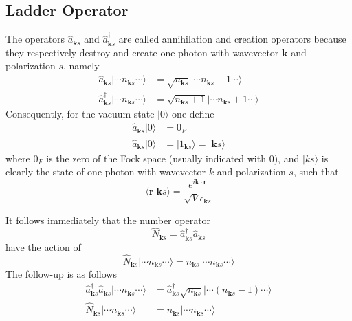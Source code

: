 \documentclass[../../../main.tex]{subfiles}
\begin{document}
\subsection{Ladder Operator}
The operators $\hat{a}_{\mathbf{k }s}$ and $\hat{a}^\dagger_{\mathbf{k }s}$ are called annihilation and creation operators because they respectively destroy and create one photon with wavevector $\mathbf{k}$ and polarization $s$, namely
\begin{align*}
  \hat{a}_{\mathbf{k }s} | \cdots n_{\mathbf{k }s} \cdots \rangle         & = \sqrt{n_{\mathbf{k }s}} |  \cdots n_{\mathbf{k }s} - 1 \cdots \rangle    \\
  \hat{a}^\dagger_{\mathbf{k }s} | \cdots n_{\mathbf{k }s} \cdots \rangle & = \sqrt{n_{\mathbf{k }s} + 1} |\cdots  n_{\mathbf{k }s} + 1 \cdots \rangle
\end{align*}
Consequently, for the vacuum state $|0\rangle$ one define
\begin{align*}
  \hat{a}_{\mathbf{k }s} | 0 \rangle   & = 0_F                                                 \\
  \hat{a}^+_{\mathbf{k }s} | 0 \rangle & = | 1_{\mathbf{k }s} \rangle = | \mathbf{k} s \rangle
\end{align*}
where $0_F$ is the zero of the Fock space (usually indicated with $0$), and $| k s \rangle$ is clearly the state of one photon with wavevector $k$ and polarization $s$, such that
\begin{equation*}
  \langle \mathbf{r} | \mathbf{k} s \rangle = \frac{e^{i \mathbf{k} \cdot \mathbf{r}}}{\sqrt{V} \epsilon_{\mathbf{k }s}}
\end{equation*}

It follows immediately that the number operator
\begin{equation*}
  \hat{N }_{\mathbf{k }s } = \hat{a } ^\dagger_{\mathbf{k }s }\hat{a }_{\mathbf{k }s}
\end{equation*}
have the action of
\begin{equation*}
  \hat{N}_{\mathbf{k }s} | \cdots n_{\mathbf{k }s} \cdots \rangle = n_{\mathbf{k }s}  | \cdots n_{\mathbf{k }s}  \cdots \rangle
\end{equation*}
The follow-up is as follows
\begin{align*}
  \hat{a}^\dagger_{\mathbf{k }s} \hat{a}_{\mathbf{k }s} | \cdots n_{\mathbf{k}s} \cdots \rangle
   & =  \hat{a }^\dagger_{\mathbf{k }s}\sqrt{n_{\mathbf{k}s}} | \cdots (n_{\mathbf{k}s} - 1) \cdots \rangle \\
  \hat{N }_{\mathbf{k }s}| \cdots n_{\mathbf{k}s} \cdots \rangle
   & =  n_{\mathbf{k}s} | \cdots n_{\mathbf{k}s} \cdots \rangle
\end{align*}
\end{document}
